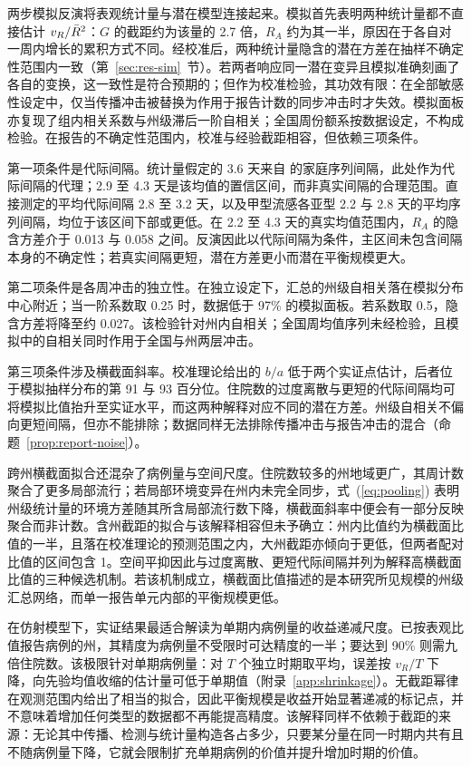 两步模拟反演将表观统计量与潜在模型连接起来。模拟首先表明两种统计量都不直接估计 $v_R/\bar{R}^2$：$G$ 的截距约为该量的 2.7 倍，$R_A$ 约为其一半，原因在于各自对一周内增长的累积方式不同。经校准后，两种统计量隐含的潜在方差在抽样不确定性范围内一致（第~\ref{sec:res-sim}~节）。若两者响应同一潜在变异且模拟准确刻画了各自的变换，这一致性是符合预期的；但作为校准检验，其功效有限：在全部敏感性设定中，仅当传播冲击被替换为作用于报告计数的同步冲击时才失效。模拟面板亦复现了组内相关系数与州级滞后一阶自相关；全国周份额系按数据设定，不构成检验。在报告的不确定性范围内，校准与经验截距相容，但依赖三项条件。

第一项条件是代际间隔。统计量假定的 3.6 天来自 \citet{cowling2009estimation} 的家庭序列间隔，此处作为代际间隔的代理；2.9 至 4.3 天是该均值的置信区间，而非真实间隔的合理范围。直接测定的平均代际间隔 2.8 至 3.2 天\citep{chan2025estimating}，以及甲型流感各亚型 2.2 与 2.8 天的平均序列间隔\citep{vink2014serial}，均位于该区间下部或更低。在 2.2 至 4.3 天的真实均值范围内，$R_A$ 的隐含方差介于 0.013 与 0.058 之间。反演因此以代际间隔为条件，主区间未包含间隔本身的不确定性；若真实间隔更短，潜在方差更小而潜在平衡规模更大。

第二项条件是各周冲击的独立性。在独立设定下，汇总的州级自相关落在模拟分布中心附近；当一阶系数取 0.25 时，数据低于 97\% 的模拟面板。若系数取 0.5，隐含方差将降至约 0.027。该检验针对州内自相关；全国周均值序列未经检验，且模拟中的自相关同时作用于全国与州两层冲击。

第三项条件涉及横截面斜率。校准理论给出的 $b/a$ 低于两个实证点估计，后者位于模拟抽样分布的第 91 与 93 百分位。住院数的过度离散与更短的代际间隔均可将模拟比值抬升至实证水平，而这两种解释对应不同的潜在方差。州级自相关不偏向更短间隔，但亦不能排除；数据同样无法排除传播冲击与报告冲击的混合（命题~\ref{prop:report-noise}）。

跨州横截面拟合还混杂了病例量与空间尺度。住院数较多的州地域更广，其周计数聚合了更多局部流行；若局部环境变异在州内未完全同步，式~(\ref{eq:pooling}) 表明州级统计量的环境方差随其所含局部流行数下降，横截面斜率中便会有一部分反映聚合而非计数。含州截距的拟合与该解释相容但未予确立：州内比值约为横截面比值的一半，且落在校准理论的预测范围之内，大州截距亦倾向于更低，但两者配对比值的区间包含 1。空间平抑因此与过度离散、更短代际间隔并列为解释高横截面比值的三种候选机制。若该机制成立，横截面比值描述的是本研究所见规模的州级汇总网络，而单一报告单元内部的平衡规模更低。

在仿射模型下，实证结果最适合解读为单期内病例量的收益递减尺度。已按表观比值报告病例的州，其精度为病例量不受限时可达精度的一半；要达到 90\% 则需九倍住院数。该极限针对单期病例量：对 $T$ 个独立时期取平均，误差按 $v_R/T$ 下降，向先验均值收缩的估计量可低于单期值（附录~\ref{app:shrinkage}）。无截距幂律在观测范围内给出了相当的拟合，因此平衡规模是收益开始显著递减的标记点，并不意味着增加任何类型的数据都不再能提高精度。该解释同样不依赖于截距的来源：无论其中传播、检测与统计量构造各占多少，只要某分量在同一时期内共有且不随病例量下降，它就会限制扩充单期病例的价值并提升增加时期的价值。

